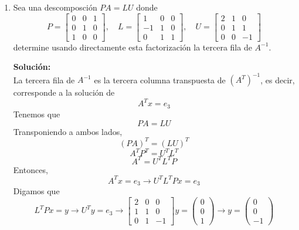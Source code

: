 \documentclass[12pt]{article}
\newenvironment{solucion}
{\begin{mdframed}[backgroundcolor=black!10]
		{\bf Solución:}\\
	}
	{
	\end{mdframed}
}
\newenvironment{preguntas}
{\begin{enumerate}\itemsep12pt
	}
	{
	\end{enumerate}
}
\newcommand{\ra}{\rightarrow}
\begin{document}
\begin{preguntas}
\begin{solucion}
$$\begin{bmatrix}
		1 & 0 & 0\\
		2 & 2 & 0\\
		3 & -1 & 1
		\end{bmatrix}$$
		Finalmente,
		$$A = \begin{bmatrix}
		1 & 0 & 0\\
		2 & 2 & 0\\
		3 & -1& 1
		\end{bmatrix}
		\begin{bmatrix}
		1 & 2 & 3\\
		0 & 2 & -1\\
		0 & 0 & 1
		\end{bmatrix}$$
\end{solucion}
\item Sea una descomposción $PA = LU$ donde
	$$P = \begin{bmatrix}
	0 & 0 & 1\\
	0 & 1 & 0\\
	1 & 0 & 0
	\end{bmatrix}, \quad
	L = \begin{bmatrix}
	1 & 0 & 0\\
	-1 & 1 & 0\\
	0 & 1 & 1
	\end{bmatrix}, \quad
	U = \begin{bmatrix}
	2 & 1 & 0\\
	0 & 1 & 1\\
	0 & 0 & -1
	\end{bmatrix}$$
	determine usando directamente esta factorización la tercera fila de $A^{-1}$.
\begin{solucion}
La tercera fila de $A^{-1}$ es la tercera columna transpuesta de $(A^T)^{-1}$, es decir, corresponde a la solución de
		$$A^Tx = e_3$$
		Tenemos que
		$$PA = LU$$
		Transponiendo a ambos lados,
		$$(PA)^T = (LU)^T$$
		$$A^TP^T = U^TL^T$$
		$$A^T = U^TL^TP$$
		Entonces,
		$$A^Tx = e_3 \ra U^TL^TPx = e_3$$
		Digamos que
		$$L^TPx = y \ra U^Ty = e_3 \ra \begin{bmatrix}
		2 & 0 & 0\\
		1 & 1 & 0\\
		0 & 1 & -1
		\end{bmatrix}y = \begin{pmatrix}
		0 \\ 0 \\ 1
		\end{pmatrix} \ra y = \begin{pmatrix}
		0 \\ 0 \\ -1

\end{pmatrix}$$
\end{solucion}
\end{preguntas}
\end{document}
